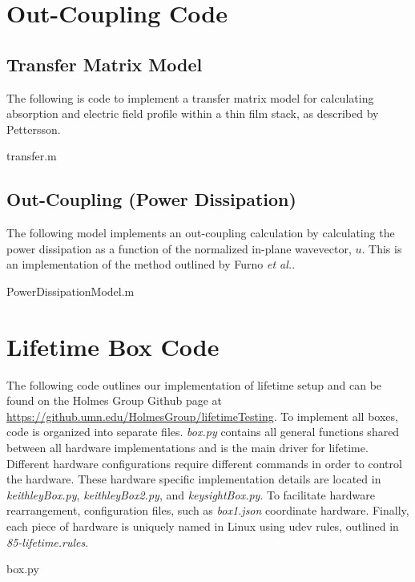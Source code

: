 \documentclass[../thesis.tex]{subfiles}
\begin{document}
\chapter{Out-Coupling Code}\label{sec:outCoupling_code}
\section{Transfer Matrix Model}
The following is code to implement a transfer matrix model for calculating absorption and electric field profile within a thin film stack, as described by Pettersson.\supercite{Pettersson1999}

transfer.m


\section{Out-Coupling (Power Dissipation)}
The following model implements an out-coupling calculation by calculating the power dissipation as a function of the normalized in-plane wavevector, $u$.  
This is an implementation of the method outlined by Furno \textit{et al.}.\supercite{Furno2010,Furno2012}

PowerDissipationModel.m


\chapter{Lifetime Box Code}\label{sec:lifetime_code}

The following code outlines our implementation of lifetime setup and can be found on the Holmes Group Github page at \url{https://github.umn.edu/HolmesGroup/lifetimeTesting}.
To implement all boxes, code is organized into separate files.
\textit{box.py} contains all general functions shared between all hardware implementations and is the main driver for lifetime.
Different hardware configurations require different commands in order to control the hardware.
These hardware specific implementation details are located in \textit{keithleyBox.py}, \textit{keithleyBox2.py}, and \textit{keysightBox.py}.
To facilitate hardware rearrangement, configuration files, such as \textit{box1.json} coordinate hardware.
Finally, each piece of hardware is uniquely named in Linux using udev rules, outlined in \textit{85-lifetime.rules}.

box.py
%
\end{document}

